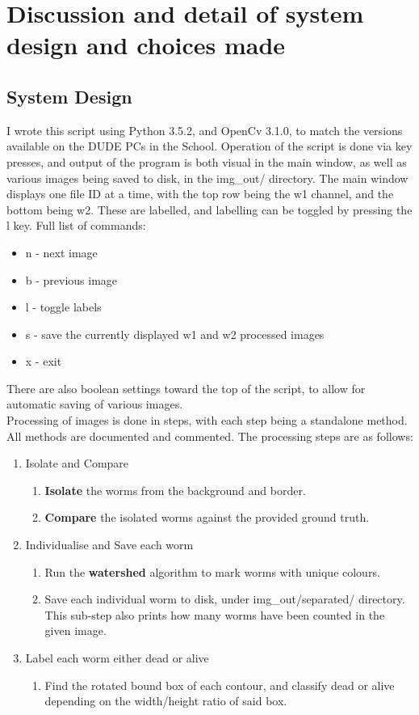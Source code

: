 \documentclass[a4paper,12pt]{article}
\begin{document}
\section*{Discussion and detail of system design and choices made}
\subsection*{System Design}
I wrote this script using Python 3.5.2, and OpenCv 3.1.0, to match the versions available on the DUDE PCs in the School.
Operation of the script is done via key presses, and output of the program is both visual in the main window, as well as various images being saved to disk, in the img\_out/ directory.
The main window displays one file ID at a time, with the top row being the w1 channel, and the bottom being w2. These are labelled, and labelling can be toggled by pressing the l key.
Full list of commands:
\begin{itemize}
    \item n - next image
    \item b - previous image
    \item l - toggle labels
    \item s - save the currently displayed w1 and w2 processed images
    \item x - exit
\end{itemize}
There are also boolean settings toward the top of the script, to allow for automatic saving of various images. \\
Processing of images is done in steps, with each step being a standalone method. All methods are documented and commented. The processing steps are as follows:
\begin{enumerate}
    \item Isolate and Compare
    \begin{enumerate}
        \item\textbf{Isolate} the worms from the background and border.
        \item\textbf{Compare} the isolated worms against the provided ground truth.
    \end{enumerate}

    \item Individualise and Save each worm
    \begin{enumerate}
        \item Run the \textbf{watershed} algorithm to mark worms with unique colours.
        \item Save each individual worm to disk, under img\_out/separated/ directory. This sub-step also prints how many worms have been counted in the given image.
    \end{enumerate}

    \item Label each worm either dead or alive
    \begin{enumerate}
        \item Find the rotated bound box of each contour, and classify dead or alive depending on the width/height ratio of said box.
    \end{enumerate}
\end{enumerate}
\end{document}
